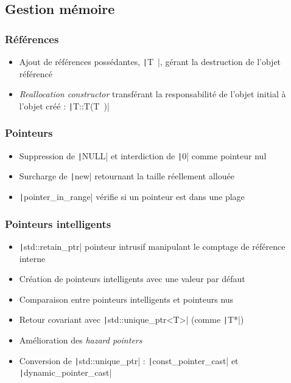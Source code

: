 \documentclass[C++.tex]{subfiles}
\begin{document}
\subsection*{Gestion mémoire}
\begin{frame}[fragile]
	\frametitle{Références}
	\begin{itemize}
		\item Ajout de références possédantes, \texttt|T~|, gérant la destruction de l'objet référencé
		\item \textit{Reallocation constructor} transférant la responsabilité de l'objet initial à l'objet créé : \texttt|T::T(T~)|
	\end{itemize}

\end{frame}

\begin{frame}[fragile]
	\frametitle{Pointeurs}
	\begin{itemize}
		\item Suppression de \texttt|NULL| et interdiction de \texttt|0| comme pointeur nul
		\item Surcharge de \texttt|new| retournant la taille réellement allouée
		\item \texttt|pointer_in_range| vérifie si un pointeur est dans une plage
	\end{itemize}

\end{frame}

\begin{frame}[fragile]
	\frametitle{Pointeurs intelligents}
	\begin{itemize}
		\item \texttt|std::retain_ptr| pointeur intrusif manipulant le comptage de référence interne
		\item Création de pointeurs intelligents avec une valeur par défaut
		\item Comparaison entre pointeurs intelligents et pointeurs nus
		\item Retour covariant avec \texttt|std::unique_ptr<T>| (comme \texttt|T*|)
		\item Amélioration des \textit{hazard pointers}
		\item Conversion de \texttt|std::unique_ptr| : \texttt|const_pointer_cast| et \texttt|dynamic_pointer_cast|
	\end{itemize}

\end{frame}
\end{document}
